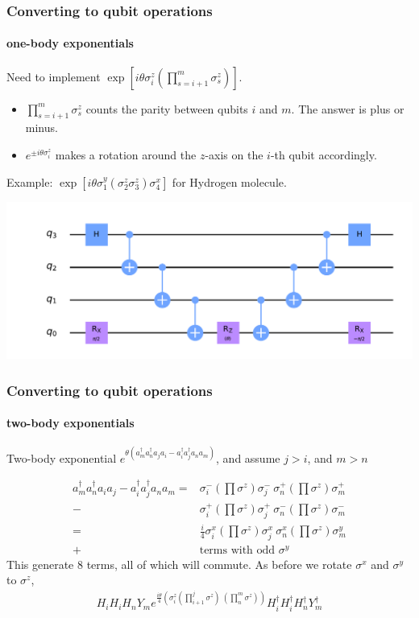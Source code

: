 \documentclass{beamer}
\renewcommand{\(}{\left(}
\renewcommand{\)}{\right)}
\renewcommand{\[}{\left[}
\renewcommand{\]}{\right]}
\begin{document}
\begin{frame}
    \frametitle{Converting to qubit operations}
    \framesubtitle{one-body exponentials}
    Need to implement $\exp\[i\theta \sigma^{z}_i \(\prod_{s=i+1}^{m} \sigma_s^z\) \]$. 
    \begin{itemize}
        \item $\prod_{s=i+1}^{m} \sigma_s^z$ counts the parity between qubits $i$ and $m$. The answer is plus or minus. 
        \item $e^{\pm i \theta\sigma^z_i }$ makes a rotation around the $z$-axis on the $i$-th qubit accordingly. 
    \end{itemize}
    \pause
    Example: $\exp\[i\theta \sigma^{y}_1 (\sigma_2^z \sigma_3^z )\sigma^{x}_4 \]$ for Hydrogen molecule.  
    \begin{center}
        \includegraphics[scale = 0.45, trim = 65 0 0 0 , clip]{a_4a_1.pdf} 
    \end{center}
\end{frame}

\begin{frame}
    \frametitle{Converting to qubit operations}
    \framesubtitle{two-body exponentials}

    Two-body exponential $e^{\theta (a^\dagger_m a^\dagger_n a_j a_i - a^\dagger_i a^\dagger_j a_n a_m  )}$, and assume $j>i$, and $m>n$ 

    \begin{align*}
        a^\dagger_m a^\dagger_n a_i a_j - a^\dagger_i a^\dagger_j a_n a_m  = &\sigma^{-}_i \(\prod \sigma^{z}\) \sigma^{-}_j\  \sigma^{+}_n \(\prod \sigma^{z}\) \sigma^{+}_m \\ 
        - & \sigma^{+}_i \(\prod \sigma^{z}\) \sigma^{+}_j\  \sigma^{-}_n \(\prod \sigma^{z}\) \sigma^{-}_m \\ 
        = & \frac{i}{4} \sigma^{x}_i \(\prod \sigma^{z}\) \sigma^{x}_j \  \sigma^{x}_n \(\prod \sigma^{z}\) \sigma^{y}_m \\ 
        + &\text{terms with odd } \sigma^{y} 
    \end{align*}
    This generate $8$ terms, all of which will commute. As before we rotate $\sigma^x$ and $\sigma^y$ to $\sigma^{z}$, 
    \begin{align*}
        H_i H_i H_n Y_m e^{\frac{i\theta}{4} \(\sigma^{z}_i \(\prod_{i+1}^{j} \sigma^{z}\)\  \(\prod_{n}^m \sigma^{z}\) \)} H^\dagger_i H^\dagger_i H^\dagger_n Y^\dagger_m
    \end{align*}
    
\end{frame}
\end{document}
